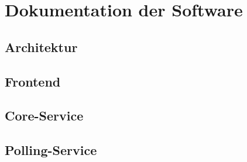 \setpagestylefoot
\renewcommand{\thefigure}{A\arabic{figure}}
\renewcommand\thelstlisting{A\arabic{lstlisting}}
\renewcommand\thetable{A\arabic{table}}

\appendix
\renewcommand{\thesection}{\Alph{section}}
\renewcommand{\thesubsection}{\Alph{section}.\Alph{subsection}}



\ifliteratur
    \printbibliography[heading=bibintoc,title={Quellen}]
\fi


\addchap{\langanhang}

\section{Dokumentation der Software}
\subsection{Architektur}
\subsection{Frontend}
\subsection{Core-Service}
\subsection{Polling-Service}